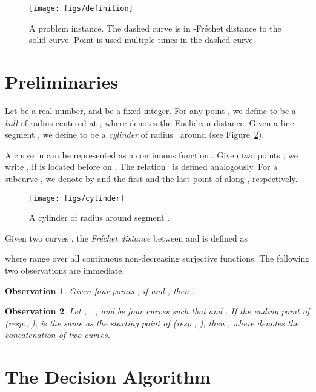 \documentclass[12pt]{dalthesis}
\newtheorem{obs}{Observation}
\newcommand{\Frechet}{Fr\'echet }
\begin{document}
\begin{figure}[t]
	\centering
	\texttt{[image: figs/definition]}
	\caption{A problem instance. The dashed curve is in -\Frechet distance to the solid curve. Point  is used multiple times in the dashed curve.}
	\label{fig:instance}
\end{figure}




\section{Preliminaries}
\label{sec:preliminariesCPM}

Let  be a real number, and  be a fixed integer.
For any point ,
we define 
to be a \emph{ball} of radius  centered at ,
where  denotes the Euclidean distance.
Given a line segment ,
we define 
to be a \emph{cylinder} of radius~ around 
(see Figure~\ref{fig:cylinder}).


A curve  in  can be represented as  a continuous function 
.
Given two points ,  
we write , if  is located before  on .
The relation~ is defined analogously.
For a subcurve ,
we denote by  and 
the first and the last point of  along , respectively.


\begin{figure}[h]
	\centering
\texttt{[image: figs/cylinder]}
	\caption{A cylinder of radius  around segment .}
	\label{fig:cylinder}
\end{figure}

Given two curves ,
the {\em \Frechet distance\/} between  and  is defined as

where  
range over all continuous non-decreasing surjective functions.
The following two observations are immediate.

\begin{obs}\label{obs:simple}
	Given four points , if
	 and , then
	. 
\end{obs}

\begin{obs}\label{obs:concat}
	Let , , , and  
	be four curves 
	such that  and
	. 
	If the ending point of  (resp., ), 
	is the same as 
	the starting point of   (resp., ),
	then ,
	where  denotes the concatenation of two curves.
\end{obs}




\section{The Decision Algorithm}
\end{document}
